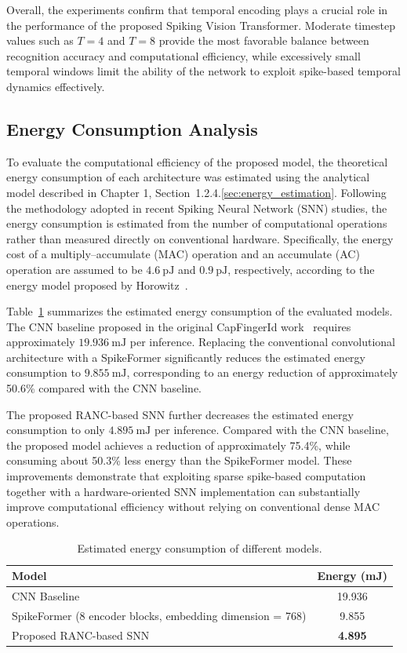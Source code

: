 \documentclass[../main.tex]{subfiles}
\begin{document}
Overall, the experiments confirm that temporal encoding plays a crucial role in the performance of the proposed Spiking Vision Transformer. Moderate timestep values such as \(T=4\) and \(T=8\) provide the most favorable balance between recognition accuracy and computational efficiency, while excessively small temporal windows limit the ability of the network to exploit spike-based temporal dynamics effectively.

\subsection{Energy Consumption Analysis}

To evaluate the computational efficiency of the proposed model, the theoretical
energy consumption of each architecture was estimated using the analytical model
described in Chapter 1, Section~1.2.4.\ref{sec:energy_estimation}. Following the methodology adopted in recent
Spiking Neural Network (SNN) studies, the energy consumption is estimated from
the number of computational operations rather than measured directly on
conventional hardware. Specifically, the energy cost of a multiply--accumulate
(MAC) operation and an accumulate (AC) operation are assumed to be
$4.6~\mathrm{pJ}$ and $0.9~\mathrm{pJ}$, respectively, according to the energy
model proposed by Horowitz~\cite{horowitz20141}.

Table~\ref{tab:energy_comparison} summarizes the estimated energy consumption of
the evaluated models. The CNN baseline proposed in the original CapFingerId
work~\cite{CapfingerId} requires approximately $19.936~\mathrm{mJ}$ per
inference. Replacing the conventional convolutional architecture with a
SpikeFormer significantly reduces the estimated energy consumption to
$9.855~\mathrm{mJ}$, corresponding to an energy reduction of approximately
50.6\% compared with the CNN baseline.

The proposed RANC-based SNN further decreases the estimated energy consumption
to only $4.895~\mathrm{mJ}$ per inference. Compared with the CNN baseline, the
proposed model achieves a reduction of approximately 75.4\%, while consuming
about 50.3\% less energy than the SpikeFormer model. These improvements
demonstrate that exploiting sparse spike-based computation together with a
hardware-oriented SNN implementation can substantially improve computational
efficiency without relying on conventional dense MAC operations.

\begin{table}[!t]
\centering
\caption{Estimated energy consumption of different models.}
\label{tab:energy_comparison}
\begin{tabular}{lc}
\hline
\textbf{Model} & \textbf{Energy (mJ)} \\
\hline
CNN Baseline~\cite{CapfingerId} & 19.936 \\
SpikeFormer (8 encoder blocks, embedding dimension = 768) & 9.855 \\
Proposed RANC-based SNN & \textbf{4.895} \\
\hline
\end{tabular}
\end{table}
\end{document}
